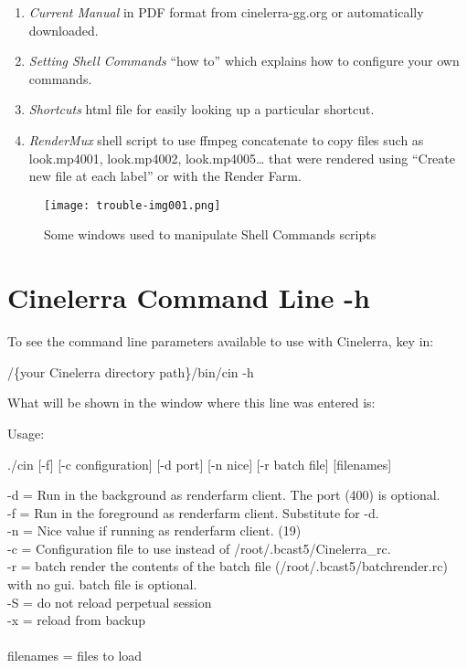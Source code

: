 \begin{enumerate}[nosep]
	\item \textit{Current Manual} in PDF format from cinelerra-gg.org or automatically downloaded.
	\item \textit{Setting Shell Commands} ``how to'' which explains how to configure your own commands.
	\item \textit{Shortcuts} html file for easily looking up a particular shortcut.
	\item \textit{RenderMux} shell script to use ffmpeg concatenate to copy files such as look.mp4001, look.mp4002, look.mp4005{\dots} that were rendered using ``Create new file at each label'' or with the Render Farm.
\end{enumerate}
\clearpage

\begin{figure}[h!]
	\centering
	\texttt{[image: trouble-img001.png]} 
	\caption{Some windows used to manipulate Shell Commands scripts}
	\label{fig:Shell script manupulation}
\end{figure}

\section{Cinelerra Command Line -h}%
\label{cha:Cinelerra Command Line -h}

To see the command line parameters available to use with Cinelerra, key in:

\hspace{10mm}/\{your Cinelerra directory path\}/bin/cin -h
\medskip

What will be shown in the window where this line was entered is:
\medskip

Usage:

./cin [-f] [-c configuration] [-d port] [-n nice] [-r batch file] [filenames]

-d = Run in the background as renderfarm client.  The port (400) is optional.\\
-f = Run in the foreground as renderfarm client. Substitute for -d.\\
-n = Nice value if running as renderfarm client. (19)\\
-c = Configuration file to use instead of /root/.bcast5/Cinelerra\_rc.\\
-r = batch render the contents of the batch file (/root/.bcast5/batchrender.rc) with no gui. batch file is optional.\\
-S = do not reload perpetual session\\
-x = reload from backup\\
\\
filenames = files to load

